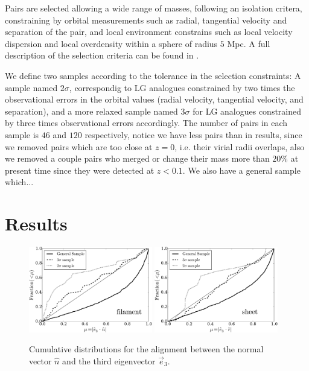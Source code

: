 \documentclass{emulateapj}
\newcommand{\mpc}{\rm{Mpc}}
\begin{document}
Pairs are selected allowing a wide range of masses, following an
isolation critera, constraining by orbital measurements such as
radial, tangential velocity and separation of the pair, and local
environment constrains such as local velocity dispersion and local
overdensity within a sphere of radius $5$ \mpc. A full description of
the selection criteria can be found in \citet{lganalogues,sat}. 

We define two samples according to the tolerance in the selection constraints:
A sample named $2\sigma$, correspondig to LG analogues constrained by
two times the observational errors in the orbital values (radial
velocity, tangential velocity, and separation), and a more relaxed
sample named $3\sigma$ for LG analogues constrained by three times
observational errors accordingly. The number of pairs in each sample
is $46$ and $120$ respectively, notice we have less pairs than in
\citet{lganalogues} results, since we removed pairs which are too
close at $z=0$, i.e. their virial radii overlaps, also we removed a
couple pairs who merged or change their mass more than $20\%$ at
present time since they were detected at $z<0.1$.  We also have a
general sample which...


\section{Results}
\label{sec:results}


\begin{figure}
\begin{center}
  \includegraphics[width=0.48\textwidth]{alignments_e3_filament.pdf} 
  \includegraphics[width=0.48\textwidth]{alignments_e3_sheet.pdf} 
\end{center}
\caption{Cumulative distributions for the alignment between the normal
  vector $\hat{n}$ and the third eigenvector $\vec{e}_3$.
    \label{fig:alignment}}  
\end{figure}
\end{document}
